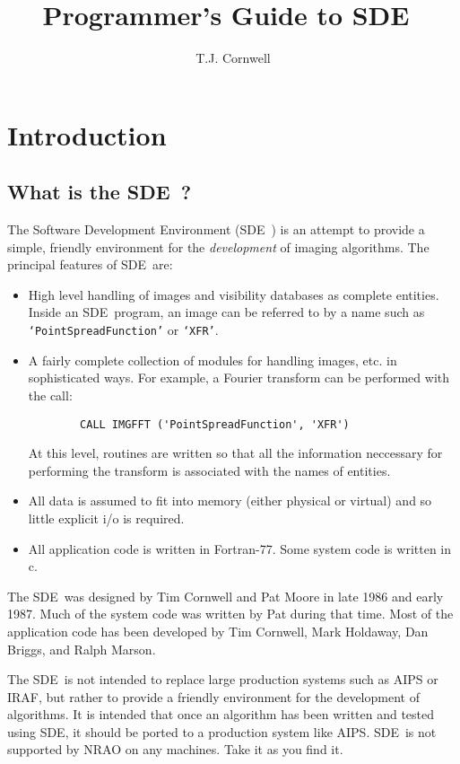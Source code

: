 \pagestyle{headings}

\newcommand{\sde}{{\sf SDE}}
\title{Programmer's Guide to \sde\ }
\author{T.J. Cornwell}
\maketitle
\tableofcontents
\newpage
\newpage
\section{Introduction}
\subsection{What is the \sde\ ?}

The Software Development Environment (\sde\ ) is an attempt to provide a
simple, friendly environment for the {\em development} of imaging algorithms.
The principal features of \sde\ are:
\begin{itemize}
\item High level handling of images and visibility databases as complete 
entities.  Inside an \sde\ program, an image can be referred to by a
name such as {\tt `PointSpreadFunction'} or {\tt `XFR'}.
\item A fairly complete collection of modules for handling images, etc.
in sophisticated ways. For example, a Fourier transform can be performed
with the call:
\begin{verbatim}
        CALL IMGFFT ('PointSpreadFunction', 'XFR')
\end{verbatim}
At this level, routines are written so that all the information
neccessary for performing the transform is associated with the names of
entities.
\item All data is assumed to fit into memory (either physical or virtual)
and so little explicit i/o is required.
\item All application code is written in Fortran-77. Some system code is
written in c. 
\end{itemize}
The \sde\ was designed by Tim Cornwell and Pat Moore in late 1986 and
early 1987. Much of the system code was written by Pat during that
time. Most of the application code has been developed by Tim Cornwell,
Mark Holdaway, Dan Briggs, and Ralph Marson.

The \sde\ is not intended to replace large production systems such as
AIPS or IRAF, but rather to provide a friendly environment for the
development of algorithms. It is intended that once an algorithm has been
written and tested using SDE, it should be ported to a production
system like AIPS. \sde\ is not supported by NRAO on any machines. Take it
as you find it.


